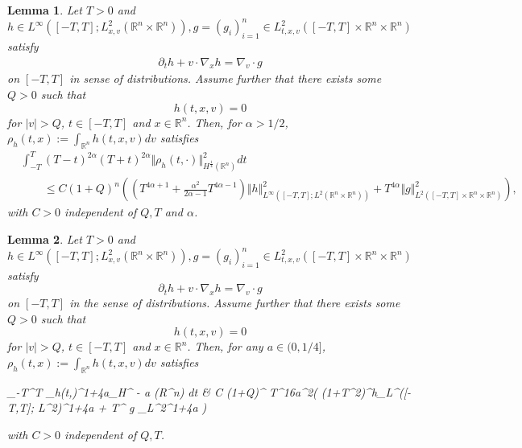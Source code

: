 \documentclass[10pt,a4paper]{amsart}
\newtheorem{lemma}{Lemma}
\newcommand{\alp}{\alpha}
\newcommand{\bbR}{\mathbb R}
\newcommand{\nb}{\nabla}
\newcommand{\nrm}[1]{\Vert#1\Vert}
\begin{document}
	{\begin{lemma} \label{lem:averaging-localized}
		Let $T>0$ and $h \in L^{\infty}([-T,T]; L^2_{x,v}(\bbR^n\times\bbR^n) ),  g = ( g_{i} )_{i=1}^{n} \in L^2_{t, x, v}([-T, T]\times\mathbb{R}^n\times\mathbb{R}^n)$  satisfy \begin{equation}\label{eq:transport}
			\begin{split}
				\partial_t h + v\cdot \nabla_x h=  \nb_v \cdot g 
			\end{split}
		\end{equation} on $[-T, T]$ in sense of distributions. Assume further that there exists some $Q>0$ such that $$h(t, x, v)=0$$ for $\vert v\vert>Q$, $t\in [-T, T]$ and $x\in \mathbb{R}^n$. Then, for $\alp>1/2$, $\rho_{h}(t, x):=\int_{\bbR^{n}} h(t, x, v)dv$ satisfies \begin{equation*}
		\begin{split}
			&\int_{-T}^{T} (T-t)^{2\alp}(T+t)^{2\alp} \Vert\rho_{h}(t,\cdot) \Vert^{2}_{ H^\frac{1}{4}(\mathbb{R}^n)} dt \\
			&\qquad \leq C(1+Q)^{n}\left( ( T^{4\alp+1} + \frac{\alp^2}{2\alp-1} T^{4\alp - 1} ) \Vert   h\Vert^2_{L^\infty([-T, T]; L^{2}(\mathbb{R}^n\times\mathbb{R}^n))} + T^{4\alp} \Vert  g \Vert^2_{L^2([-T, T]\times\mathbb{R}^n\times\mathbb{R}^n)} \right),
		\end{split}
		\end{equation*} with $C>0$ independent of $Q, T$ and $\alp$.  
	\end{lemma}

	{\begin{lemma} \label{lem:averaging-localized-integrated}
		Let $T>0$ and $h \in L^{\infty}([-T,T]; L^2_{x,v}(\bbR^n\times\bbR^n)), g = ( g_{i} )_{i=1}^{n} \in L^2_{t, x, v}([-T, T]\times\mathbb{R}^n\times\mathbb{R}^n)$  satisfy
		$$\partial_t h + v\cdot \nabla_x h=  \nb_{v} \cdot g$$ on $[-T, T]$ in the sense of distributions. Assume further that there exists some $Q>0$ such that $$h(t, x, v)=0$$ for $\vert v\vert>Q$, $t\in [-T, T]$ and $x\in \mathbb{R}^n$. Then, for any $a \in (0,1/4]$, $\rho_{h}(t, x):=\int_{\bbR^{n}} h(t, x, v)dv$ satisfies
		\begin{flalign*}
			\int_{-T}^{T} \nrm{\rho_{h}(t,\cdot)}^{1+4a}_{H^{ - a }(\bbR^n)}  dt & \le C (1+Q)^{} T^{16a^2}\left( (1+T^2)^\Vert h\Vert_{L^\infty([-T,T]; L^{2})}^{1+4a} + T^ \Vert g \Vert_{L^2}^{1+4a} \right)
		\end{flalign*}  with $C>0$ independent of $Q, T$. 
	\end{lemma}

}}
\end{document}
